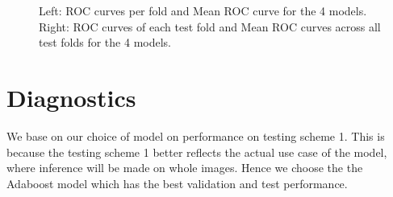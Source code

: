 \documentclass[11pt, letterpaper, journal]{IEEEtran}
\begin{document}
\begin{figure}%
    \centering
    \qquad
    \caption{Left: ROC curves per fold and Mean ROC curve for the 4 models. Right: ROC curves of each test fold and Mean ROC curves across all test folds for the 4 models. }%
    \label{fig:ROC_curves scheme2}%
\end{figure}


\section{Diagnostics}
We base on our choice of model on performance on testing scheme 1. This is because the testing scheme 1 better reflects the actual use case of the model, where inference will be made on whole images. Hence we choose the the Adaboost model which has the best validation and test performance. 
\end{document}

